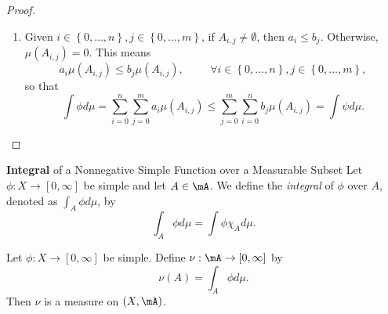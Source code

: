 \documentclass[pmath451]{subfiles}
\begin{document}
\begin{proof}
\begin{enumerate}
            \item Given $i\in\left\lbrace 0,\ldots,n \right\rbrace, j\in\left\lbrace 0,\ldots,m \right\rbrace$, if $A_{i,j}\neq\emptyset$, then $a_i\leq b_j$. Otherwise, $\mu\left( A_{i,j} \right) = 0$. This means
                \begin{equation*}
                    a_i\mu\left( A_{i,j} \right) \leq b_j\mu\left( A_{i,j} \right),\hspace{1cm}\forall i\in\left\lbrace 0,\ldots,n \right\rbrace,j\in\left\lbrace 0,\ldots,m \right\rbrace,
                \end{equation*}
                so that
                \begin{equation*}
                    \int\phi d\mu = \sum^{n}_{i=0}\sum^{m}_{j=0} a_i\mu\left( A_{i,j} \right) \leq \sum^{m}_{j=0}\sum^{n}_{i=0} b_j\mu\left( A_{i,j} \right) = \int\psi d\mu.
                \end{equation*}
        \end{enumerate}
    \end{proof}

    \begin{definition}{\textbf{Integral} of a Nonnegative Simple Function over a Measurable Subset}
        Let $\phi:X\to\left[ 0,\infty \right]$ be simple and let $A\in\mA$. We define the \emph{integral} of $\phi$ over $A$, denoted as $\int_A\phi d\mu$, by
        \begin{equation*}
            \int_A\phi d\mu = \int\phi\chi_Ad\mu.
        \end{equation*}
    \end{definition}
    
    \begin{prop}{}
        Let $\phi:X\to\left[ 0,\infty \right]$ be simple. Define $\nu:\mA\to\left[ 0,\infty \right]$ by
        \begin{equation*}
            \nu\left( A \right) = \int_A\phi d\mu.
        \end{equation*}
        Then $\nu$ is a measure on $\left( X,\mA \right)$.
    \end{prop}
\end{document}
